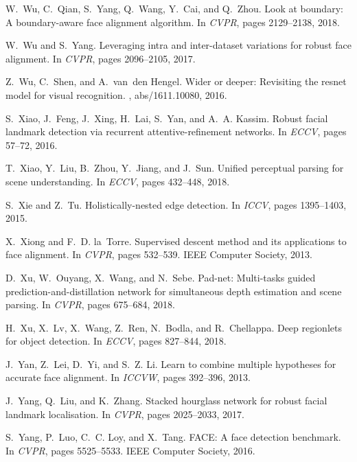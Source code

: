 \documentclass[10pt,twocolumn,letterpaper]{article}
\begin{document}
{\begin{thebibliography}{100}
W.~Wu, C.~Qian, S.~Yang, Q.~Wang, Y.~Cai, and Q.~Zhou.
\newblock Look at boundary: {A} boundary-aware face alignment algorithm.
\newblock In {\em {CVPR}}, pages 2129--2138, 2018.

W.~Wu and S.~Yang.
\newblock Leveraging intra and inter-dataset variations for robust face
  alignment.
\newblock In {\em {CVPR}}, pages 2096--2105, 2017.

Z.~Wu, C.~Shen, and A.~van~den Hengel.
\newblock Wider or deeper: Revisiting the resnet model for visual recognition.
, abs/1611.10080, 2016.

S.~Xiao, J.~Feng, J.~Xing, H.~Lai, S.~Yan, and A.~A. Kassim.
\newblock Robust facial landmark detection via recurrent attentive-refinement
  networks.
\newblock In {\em {ECCV}}, pages 57--72, 2016.

T.~Xiao, Y.~Liu, B.~Zhou, Y.~Jiang, and J.~Sun.
\newblock Unified perceptual parsing for scene understanding.
\newblock In {\em {ECCV}}, pages 432--448, 2018.

S.~Xie and Z.~Tu.
\newblock Holistically-nested edge detection.
\newblock In {\em {ICCV}}, pages 1395--1403, 2015.

X.~Xiong and F.~D. la~Torre.
\newblock Supervised descent method and its applications to face alignment.
\newblock In {\em {CVPR}}, pages 532--539. {IEEE} Computer Society, 2013.

D.~Xu, W.~Ouyang, X.~Wang, and N.~Sebe.
\newblock Pad-net: Multi-tasks guided prediction-and-distillation network for
  simultaneous depth estimation and scene parsing.
\newblock In {\em {CVPR}}, pages 675--684, 2018.

H.~Xu, X.~Lv, X.~Wang, Z.~Ren, N.~Bodla, and R.~Chellappa.
\newblock Deep regionlets for object detection.
\newblock In {\em {ECCV}}, pages 827--844, 2018.

J.~Yan, Z.~Lei, D.~Yi, and S.~Z. Li.
\newblock Learn to combine multiple hypotheses for accurate face alignment.
\newblock In {\em {ICCVW}}, pages 392--396, 2013.

J.~Yang, Q.~Liu, and K.~Zhang.
\newblock Stacked hourglass network for robust facial landmark localisation.
\newblock In {\em {CVPR}}, pages 2025--2033, 2017.

S.~Yang, P.~Luo, C.~C. Loy, and X.~Tang.
 {FACE:} {A} face detection benchmark.
\newblock In {\em {CVPR}}, pages 5525--5533. {IEEE} Computer Society, 2016.


\end{thebibliography}}
\end{document}
